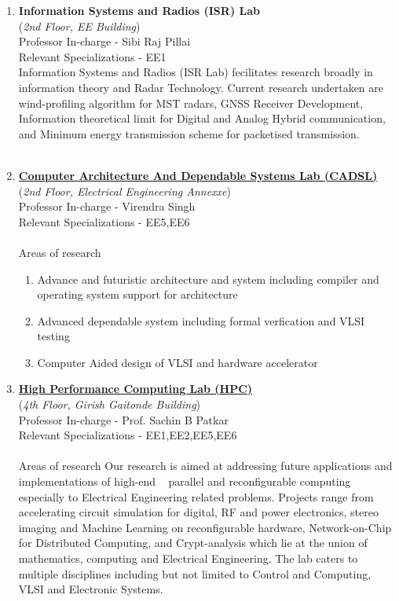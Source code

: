 \documentclass[openany]{book} %
\begin{document}
\begin{enumerate}
\item \textbf{Information Systems and Radios (ISR) Lab}\\
    (\textit{2nd Floor, EE Building})\\
    Professor In-charge - Sibi Raj Pillai\\
Relevant Specializations - EE1\\
Information Systems and Radios (ISR Lab) fecilitates  research broadly in information theory and Radar Technology. Current research undertaken are wind-profiling algorithm for MST radars, GNSS Receiver Development, Information theoretical limit for Digital and Analog Hybrid communication, and Minimum energy transmission scheme for packetised transmission.
\\
\\
\item \href{https://www.ee.iitb.ac.in/student/~cadsl/} {\color{blue} \textbf{Computer Architecture And Dependable Systems Lab (CADSL)}}\\
    (\textit{2nd Floor, Electrical Engineering Annexxe})\\
    Professor In-charge - Virendra Singh\\
Relevant Specializations - EE5,EE6\\
\\
Areas of research
\begin{enumerate}
	\item Advance and futuristic architecture and system including compiler and operating system support for architecture
	\item Advanced dependable system including formal verfication and VLSI testing
	\item Computer Aided design of VLSI and hardware accelerator
\end{enumerate}
 
\item \href{https://www.ee.iitb.ac.in/~hpc/} {\color{blue} \textbf{High Performance Computing Lab (HPC)}}\\
    (\textit{4th Floor, Girish Gaitonde Building})\\
    Professor In-charge - Prof. Sachin B Patkar\\
Relevant Specializations - EE1,EE2,EE5,EE6\\
\\
Areas of research
Our research is aimed at addressing future applications and implementations of high-end   parallel and reconfigurable computing especially to Electrical Engineering related problems. Projects range from accelerating circuit simulation for digital, RF and power electronics, stereo imaging and Machine Learning on reconfigurable hardware, Network-on-Chip for Distributed Computing, and Crypt-analysis which lie at the union of mathematics, computing and Electrical Engineering. The lab caters to multiple disciplines including but not limited to Control and Computing, VLSI and Electronic Systems.


\end{enumerate}
\end{document}
